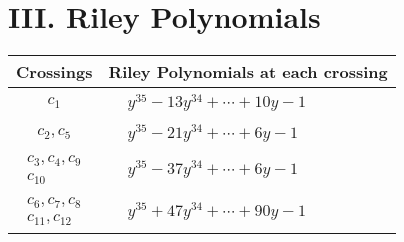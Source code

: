 \documentclass[1p]{elsarticle_modified}
\theoremstyle{definition}
\begin{document}
\centering \section*{ III. Riley Polynomials}
\begin{tabular}{m{50pt}|m{274pt}}
Crossings & \hspace{64pt}Riley Polynomials at each crossing \\
\hline $$\begin{aligned}c_{1}\end{aligned}$$&$\begin{aligned}
&y^{35}-13 y^{34}+\cdots+10 y-1
\end{aligned}$\\
\hline $$\begin{aligned}c_{2},c_{5}\end{aligned}$$&$\begin{aligned}
&y^{35}-21 y^{34}+\cdots+6 y-1
\end{aligned}$\\
\hline $$\begin{aligned}c_{3},c_{4},c_{9}\\c_{10}\end{aligned}$$&$\begin{aligned}
&y^{35}-37 y^{34}+\cdots+6 y-1
\end{aligned}$\\
\hline $$\begin{aligned}c_{6},c_{7},c_{8}\\c_{11},c_{12}\end{aligned}$$&$\begin{aligned}
&y^{35}+47 y^{34}+\cdots+90 y-1
\end{aligned}$\\
\hline
\end{tabular}
\vskip 2pc
\end{document}
